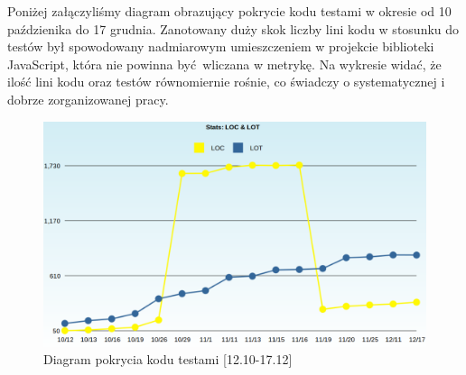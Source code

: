     Poniżej załączyliśmy diagram obrazujący pokrycie kodu testami w okresie od 10 paździenika do 17 grudnia. Zanotowany duży skok liczby lini kodu w stosunku do testów był spowodowany nadmiarowym umieszczeniem w projekcie biblioteki JavaScript, która nie powinna być wliczana w metrykę.
    Na wykresie widać, że ilość lini kodu oraz testów równomiernie rośnie, co świadczy o systematycznej i dobrze zorganizowanej pracy.
    \begin{figure}[h]
      \centering
      \includegraphics[scale=0.35]{images/LOC.png}
      \caption{Diagram pokrycia kodu testami [12.10-17.12]}
    \end{figure}
